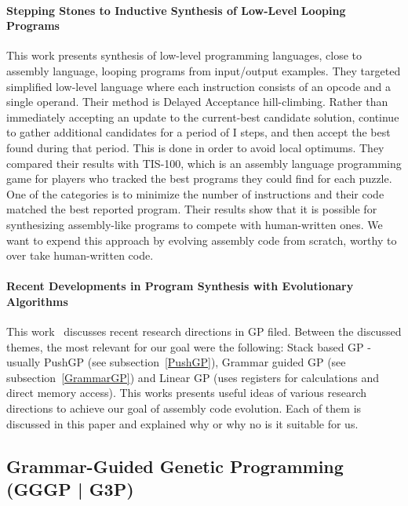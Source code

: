 \documentclass[dvipsnames,format=sigconf,anonymous=true,review=true]{acmart}
\begin{document}
\paragraph{Stepping Stones to Inductive Synthesis of Low-Level Looping Programs}
This work \cite{Rosin2019Stepping} presents synthesis of low-level programming languages, close to assembly language, looping programs from input/output examples. They targeted simplified low-level language where each instruction consists of an opcode and a single operand. Their method is Delayed Acceptance hill-climbing. Rather than immediately accepting an update to the current-best candidate solution, continue to gather additional candidates for a period of I steps, and then accept the best found during that period. This is done in order to avoid local optimums. They compared their results with TIS-100, which is an assembly language programming game for players who tracked the best programs they could find for each puzzle. One of the categories is to minimize the number of instructions and their code matched the best reported program.
Their results show that it is possible for synthesizing assembly-like programs to compete with human-written ones. We want to expend this approach by evolving assembly code from scratch, worthy to over take human-written code.

\paragraph{Recent Developments in Program Synthesis with Evolutionary Algorithms}
This work~\cite{domonik2021recent} discusses recent research directions in GP filed. Between the discussed themes, the most relevant for our goal were the following: Stack based GP - usually PushGP (see subsection~\autoref{PushGP}), Grammar guided GP (see subsection~\autoref{GrammarGP}) and Linear GP (uses registers for calculations and direct memory access).
This works presents useful ideas of various research directions to achieve our goal of assembly code evolution. Each of them is discussed in this paper and explained why or why no is it suitable for us.

\subsection{Grammar-Guided Genetic Programming (GGGP | G3P)}
\label{GrammarGP}
\end{document}
